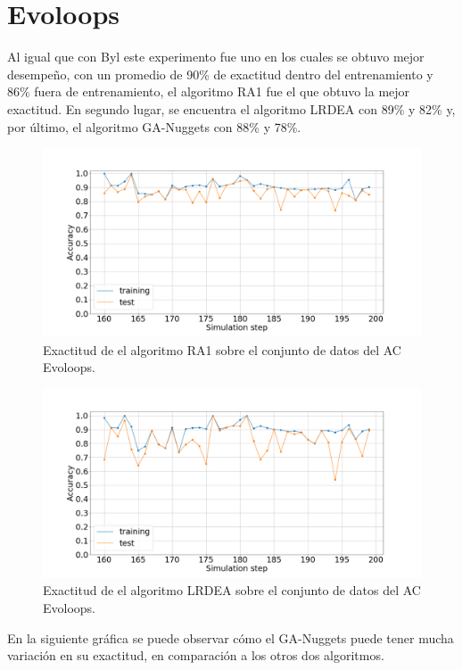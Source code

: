 \section{Evoloops}
Al igual que con Byl este experimento fue uno en los cuales se obtuvo mejor desempeño, con un promedio de 90\% de exactitud dentro del entrenamiento y 86\% fuera de entrenamiento, el algoritmo RA1 fue el que obtuvo la mejor exactitud. En segundo lugar, se encuentra el algoritmo LRDEA con 89\% y 82\% y, por último, el algoritmo GA-Nuggets con 88\% y 78\%.
\begin{figure}[H]
	\centering
	\includegraphics[width=\linewidth]{fig/ra1_6}
	\caption{Exactitud de el algoritmo RA1 sobre el conjunto de datos del AC Evoloops.}
	\label{fig:ra1evoloops}
\end{figure}
\begin{figure}[H]
	\centering
	\includegraphics[width=\linewidth]{fig/LRDEA_7}
	\caption{Exactitud de el algoritmo LRDEA sobre el conjunto de datos del AC Evoloops.}
	\label{fig:lrdeaevoloops}
\end{figure}

En la siguiente gráfica se puede observar cómo el GA-Nuggets puede tener mucha variación en su exactitud, en comparación a los otros dos algoritmos.

